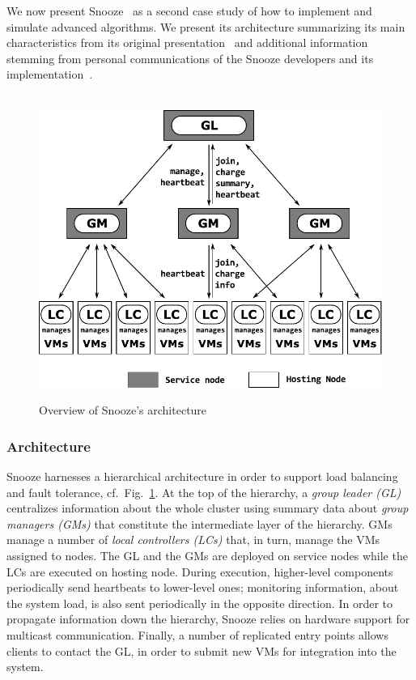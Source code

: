 We now present Snooze~\cite{feller:ccgrid12} as a second case study of how
to implement and simulate advanced algorithms.
We present its architecture summarizing its main
characteristics from its original presentation~\cite{feller:ccgrid12} and
additional information  stemming from personal communications of the Snooze
developers and its implementation~\cite{snoozeweb,snoozedev14}.
\begin{figure}
  {\centering ~\includegraphics[width=.95\linewidth]{figures/snoozearch.pdf}}
  \caption{Overview of Snooze's architecture}
  \label{fig:snoozearch}
\end{figure}

\subsubsection{Architecture}
\label{sec:snoozeArchi}

Snooze harnesses a hierarchical architecture in order to support load
balancing and fault tolerance, cf.\ Fig.~\ref{fig:snoozearch}. At the
top of the hierarchy, a \emph{group leader (GL)} centralizes
information about the whole cluster using summary data about
\emph{group managers (GMs)} that constitute the intermediate layer of
the hierarchy. GMs manage a number of \emph{local controllers (LCs)}
that, in turn, manage the VMs assigned to nodes. The GL and the GMs
are deployed on service nodes while the LCs are executed on hosting
node.  During execution, higher-level components periodically send
heartbeats to lower-level ones; monitoring information, \eg about the
system load, is also sent periodically in the opposite direction. In
order to propagate information down the hierarchy, Snooze relies on
hardware support for multicast communication. Finally, a number of
replicated entry points allows clients to contact the GL, \eg in order
to submit new VMs for integration into the system.

